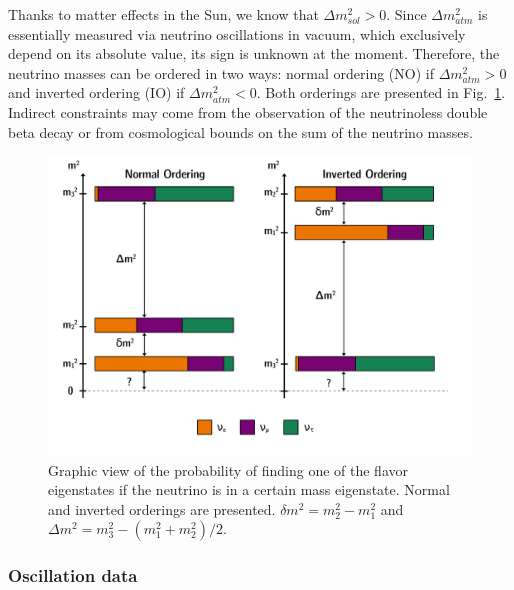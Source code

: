 Thanks to matter effects in the Sun, we know that $\Delta m^2_{sol}>0$.
Since $\Delta m^2_{atm}$ is essentially measured via neutrino oscillations in vacuum, which exclusively depend on its absolute value, its sign is unknown at the moment.
Therefore, the neutrino masses can be ordered in two ways: normal ordering (NO) if $\Delta m^2_{atm}>0$ and inverted ordering (IO) if $\Delta m^2_{atm}<0$.
Both orderings are presented in Fig.~\ref{fig:IO_NO}.
Indirect constraints may come from the observation of the neutrinoless double beta decay or from cosmological bounds on the sum of the neutrino masses.
\begin{figure}[h!]
  \centering
  \includegraphics[width=1\textwidth]{neutrinophysics/fig_neutrinophysics/IO_NO.pdf}
  \caption{Graphic view of the probability of finding one of the flavor eigenstates if the neutrino is in a certain mass eigenstate.
    Normal and inverted orderings are presented.
    ${\delta m^2=m_2^2-m_1^2}$ and ${\Delta m^2=m_3^2-(m_1^2+m_2^2)/2}$.
    \label{fig:IO_NO}}
\end{figure}

\subsubsection*{Oscillation data}

